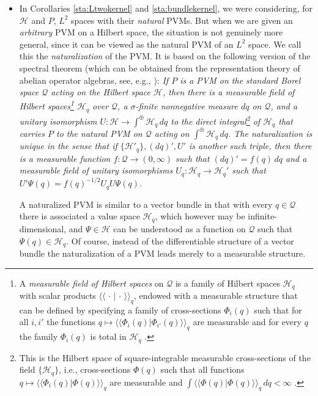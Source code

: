 \documentclass[12pt]{article}
\newcommand{\1}{\mathbf{1}} %
\newcommand{\Hilbert}{\mathscr{H}}
\newcommand{\scalar}[2]{\langle\!\langle #1 | #2 \rangle\!\rangle} %
\newcommand{\conf}{\mathcal{Q}} %
\newcommand{\pov}{{P}}%
\begin{document}
\begin{itemize}
\item In Corollaries \ref{sta:Ltwokernel} and \ref{sta:bundlekernel},
   we were considering, for $\Hilbert$ and $\pov$, $L^2$ spaces with
   their \emph{natural} PVMs. But when we are given an \emph{arbitrary}
   PVM on a Hilbert space, the situation is not genuinely more general,
   since it can be viewed as the natural PVM of an $L^2$ space. We call
   this the \emph{naturalization} of the PVM. It is based on the
   following version of the spectral theorem (which can be obtained
   from the representation theory of abelian operator algebras, see,
   e.g., \cite{Dixmier}): \textit{If $\pov$ is a PVM on the standard
   Borel space $\conf$ acting on the Hilbert space $\Hilbert$, then
   there is a measurable field of Hilbert spaces\footnote{A
   \emph{measurable field of Hilbert spaces} on $\conf$ is a family of
   Hilbert spaces $\Hilbert_q$ with scalar products
   $\scalar{\,\cdot\,}{\,\cdot\,}_q$, endowed with a measurable
   structure that can be defined by specifying a family of
   cross-sections $\Phi_i(q)$ such that for all $i,i'$ the functions $q
   \mapsto \scalar{\Phi_i(q)}{\Phi_{i'}(q)}_q$ are measurable and for
   every $q$ the family $\Phi_i(q)$ is total in $\Hilbert_q$
   \cite{Guichardet}.}  $\Hilbert_q$ over $\conf$, a $\sigma$-finite
   nonnegative measure $dq$ on $\conf$, and a unitary isomorphism $U:
   \Hilbert \to \int^\oplus \Hilbert_q \, dq$ to the direct
   integral\footnote{This is the Hilbert space of square-integrable
   measurable cross-sections of the field $\{\Hilbert_q\}$, i.e.,
   cross-sections $\Phi(q)$ such that all functions $q \mapsto
   \scalar{\Phi_i(q)}{\Phi(q)}_q$  are measurable and $\int
   \scalar{\Phi(q)}{\Phi(q)}_q \, dq < \infty$ \cite{Guichardet}.} of
   $\Hilbert_q$ that carries $\pov$ to the natural PVM on $\conf$
   acting on $\int^\oplus \Hilbert_q \, dq$. The naturalization is
   unique in the sense that if $\{\Hilbert'_q\}, (dq)', U'$ is another
   such triple, then there is a measurable function $f:\conf \to
   (0,\infty)$ such that $(dq)' = f(q) \, dq$ and a measurable field of
   unitary isomorphisms $U_q: \Hilbert_q \to \Hilbert_q'$ such that
   $U'\Psi(q) = f(q)^{-1/2} U_q U\Psi(q)$.}

   A naturalized PVM is similar to a vector bundle in that with every
   $q\in \conf$ there is associated a value space $\Hilbert_q$, which
   however may be infinite-dimensional, and $\Psi \in \Hilbert$ can be
   understood as a function on $\conf$ such that $\Psi(q) \in
   \Hilbert_q$. Of course, instead of the differentiable structure of a
   vector bundle the naturalization of a PVM leads merely to  a
   measurable structure.
\end{itemize}
\end{document}
